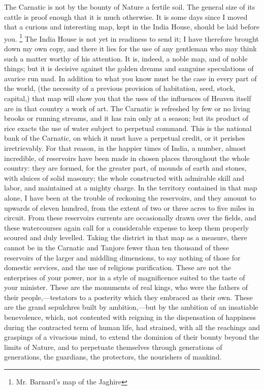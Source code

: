 The Carnatic is not by the bounty of Nature a fertile soil. The general size of its cattle is proof enough that it is much otherwise. It is some days since I moved that a curious and interesting map, kept in the India House, should be laid before you.
\footnote{ Mr. Barnard's map of the Jaghire}
 The India House is not yet in readiness to send it; I have therefore brought down my own copy, and there it lies for the use of any gentleman who may think such a matter worthy of his attention. It is, indeed, a noble map, and of noble things; but it is decisive against the golden dreams and sanguine speculations of avarice run mad. In addition to what you know must be the case in every part of the world, (the necessity of a previous provision of habitation, seed, stock, capital,) that map will show you that the uses of the influences of Heaven itself are in that country a work of art. The Carnatic is refreshed by few or no living brooks or running streams, and it has rain only at a season; but its product of rice exacts the use of water subject to perpetual command. This is the national bank of the Carnatic, on which it must have a perpetual credit, or it perishes irretrievably. For that reason, in the happier times of India, a number, almost incredible, of reservoirs have been made in chosen places throughout the whole country: they are formed, for the greater part, of mounds of earth and stones, with sluices of solid masonry; the whole constructed with admirable skill and labor, and maintained at a mighty charge. In the territory contained in that map alone, I have been at the trouble of reckoning the reservoirs, and they amount to upwards of eleven hundred, from the extent of two or three acres to five miles in circuit. From these reservoirs currents are occasionally drawn over the fields, and these watercourses again call for a considerable expense to keep them properly scoured and duly levelled. Taking the district in that map as a measure, there cannot be in the Carnatic and Tanjore fewer than ten thousand of these reservoirs of the larger and middling dimensions, to say nothing of those for domestic services, and the use of religious purification. These are not the enterprises of your power, nor in a style of magnificence suited to the taste of your minister. These are the monuments of real kings, who were the fathers of their people,—testators to a posterity which they embraced as their own. These are the grand sepulchres built by ambition,—but by the ambition of an insatiable benevolence, which, not contented with reigning in the dispensation of happiness during the contracted term of human life, had strained, with all the reachings and graspings of a vivacious mind, to extend the dominion of their bounty beyond the limits of Nature, and to perpetuate themselves through generations of generations, the guardians, the protectors, the nourishers of mankind.

